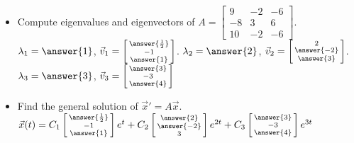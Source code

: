 \documentclass{ximera}
\begin{document}

\begin{exercise}
    \begin{itemize}
        \item Compute eigenvalues and eigenvectors of
        $A = 
        \left[ 
            \begin{smallmatrix}
                9 & -2 & -6 \\
                -8 & 3 & 6 \\
                10 & -2 & -6
            \end{smallmatrix} 
        \right]$.\\
            $\lambda_1 = \answer{1}$, $\vec{v}_1 = \left[\begin{smallmatrix} \answer{\frac{1}{2}} \\ -1 \\ \answer{1} \end{smallmatrix}\right]$. $\lambda_2 = \answer{2}$, $\vec{v}_2 = \left[\begin{smallmatrix} 2 \\ \answer{-2} \\ \answer{3} \end{smallmatrix}\right]$. $\lambda_3 = \answer{3}$, $\vec{v}_3 = \left[\begin{smallmatrix} \answer{3} \\ -3 \\ \answer{4} \end{smallmatrix}\right]$
        \item Find the general solution of ${\vec{x}}' = A \vec{x}$.\\
            $\vec{x}(t) = C_1\left[\begin{smallmatrix} \answer{\frac{1}{2}} \\ -1 \\ \answer{1} \end{smallmatrix}\right]e^t + C_2\left[\begin{smallmatrix} \answer{2} \\ \answer{-2} \\ 3 \end{smallmatrix}\right]e^{2t} + C_3\left[\begin{smallmatrix} \answer{3} \\ -3 \\ \answer{4} \end{smallmatrix}\right]e^{3t}$
    \end{itemize}
\end{exercise}
\end{document}
